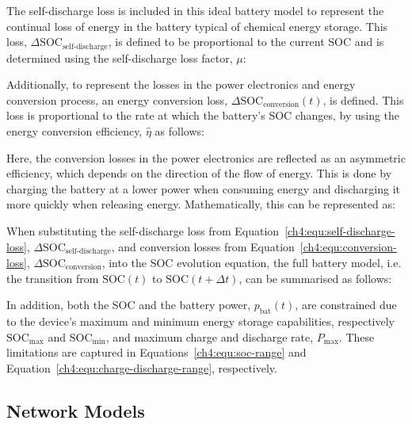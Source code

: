 

The self-discharge loss is included in this ideal battery model to represent the continual loss of energy in the battery typical of chemical energy storage.
This loss, $\Delta\text{SOC}_\text{self-discharge}$, is defined to be proportional to the current SOC and is determined using the self-discharge loss factor, $\mu$:



Additionally, to represent the losses in the power electronics and energy conversion process, an energy conversion loss, $\Delta\text{SOC}_\text{conversion}(t)$, is defined.
This loss is proportional to the rate at which the battery's SOC changes, by using the energy conversion efficiency, $\hat{\eta}$ as follows:



Here, the conversion losses in the power electronics are reflected as an asymmetric efficiency, which depends on the direction of the flow of energy.
This is done by charging the battery at a lower power when consuming energy and discharging it more quickly when releasing energy.
Mathematically, this can be represented as:



When substituting the self-discharge loss from Equation~\ref{ch4:equ:self-discharge-loss}, $\Delta\text{SOC}_\text{self-discharge}$, and conversion losses from Equation~\ref{ch4:equ:conversion-loss}, $\Delta\text{SOC}_\text{conversion}$, into the SOC evolution equation, the full battery model, i.e. the transition from $\text{SOC}(t)$ to $\text{SOC}(t+\Delta t)$, can be summarised as follows:



In addition, both the SOC and the battery power, $p_\text{bat}(t)$, are constrained due to the device's maximum and minimum energy storage capabilities, respectively $\text{SOC}_\text{max}$ and $\text{SOC}_\text{min}$, and maximum charge and discharge rate, $P_\text{max}$.
These limitations are captured in Equations~\ref{ch4:equ:soc-range} and Equation~\ref{ch4:equ:charge-discharge-range}, respectively.





\subsection{Network Models}
\label{ch4:subsec:network-models}


